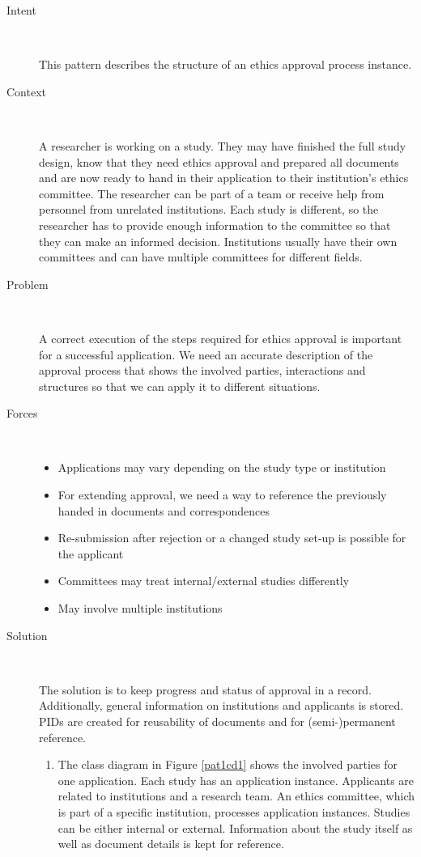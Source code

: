 \documentclass[10pt]{article}
\begin{document}
\begin{description}
	\item[Intent]~\par
		This pattern describes the structure of an ethics approval process instance.

	\item[Context]~\par
		A researcher is working on a study. They may have finished the full study design, know that they need ethics approval and prepared all documents and are now ready to hand in their application to their institution's ethics committee. The researcher can be part of a team or receive help from personnel from unrelated institutions. Each study is different, so the researcher has to provide enough information to the committee so that they can make an informed decision. Institutions usually have their own committees and can have multiple committees for different fields.

	\item[Problem]~\par
		A correct execution of the steps required for ethics approval is important for a successful application. We need an accurate description of the approval process that shows the involved parties, interactions and structures so that we can apply it to different situations.

	\item[Forces]~\par
	\begin{itemize}
		\item Applications may vary depending on the study type or institution
		\item For extending approval, we need a way to reference the previously handed in documents and correspondences
		\item Re-submission after rejection or a changed study set-up is possible for the applicant
		\item Committees may treat internal/external studies differently
		\item May involve multiple institutions
	\end{itemize}

	\item[Solution]~\par
		The solution is to keep progress and status of approval in a record. Additionally,  general information on institutions and applicants is stored. PIDs are created for reusability of documents and for (semi-)permanent reference.
	\begin{enumerate}
		\item The class diagram in Figure \ref{pat1cd1} shows the involved parties for one application. Each study has an application instance. Applicants are related to institutions and a research team. An ethics committee, which is part of a specific institution, processes application instances. Studies can be either internal or external. Information about the study itself as well as document details is kept for reference.


\end{enumerate}
\end{description}
\end{document}
